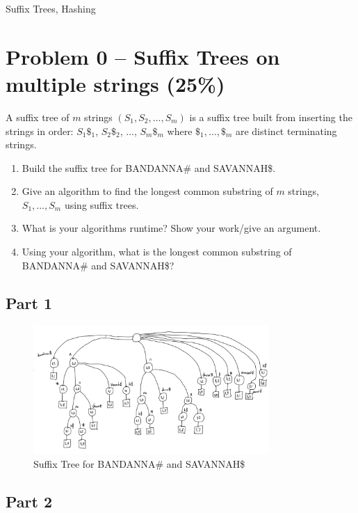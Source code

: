 \documentclass[12pt,letterpaper]{article}
\begin{document}
\begin{center}
    \LARGE Suffix Trees, Hashing
\end{center}


\section*{Problem 0 -- Suffix Trees on multiple strings (25\%)}
A suffix tree of $m$ strings $(S_1,S_2,\dots,S_m)$ is a suffix tree built from inserting the strings in order: $S_1\$_1$, $S_2\$_2$, $\dots$, $S_m\$_m$ where $\$_1,\dots,\$_m$ are distinct terminating strings.

\begin{enumerate}
    \item Build the suffix tree for BANDANNA\# and SAVANNAH\$.
    \item Give an algorithm to find the longest common substring of $m$ strings, $S_1,\dots,S_m$ using suffix trees. 
    \item What is your algorithms runtime? Show your work/give an argument.
    \item Using your algorithm, what is the longest common substring of BANDANNA\# and SAVANNAH\$?
\end{enumerate}

\subsection*{Part 1}

\begin{figure}[!htb]
    \centering
    \includegraphics[width=0.8\textwidth]{suffix_tree.jpeg}
    \caption{Suffix Tree for BANDANNA\# and SAVANNAH\$}
    \label{fig:suffix_tree}
\end{figure}

\newpage
\subsection*{Part 2}
\end{document}
